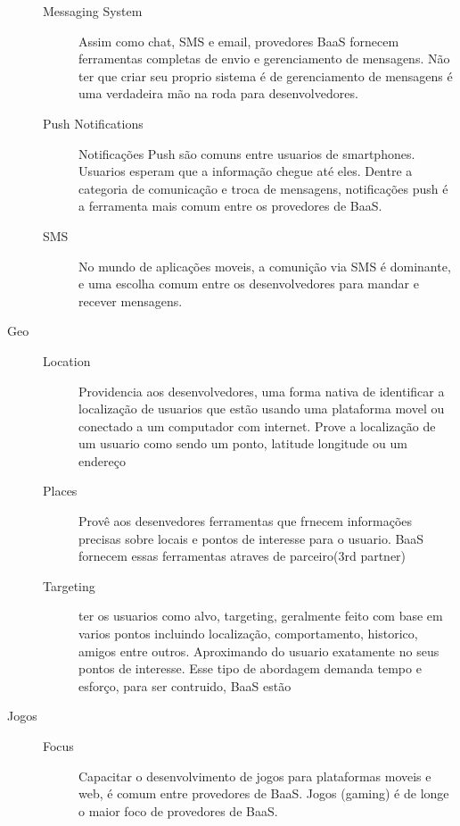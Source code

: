 \begin{description}
\begin{description}
				\item[Messaging System] { Assim como chat, SMS e email, provedores BaaS fornecem ferramentas completas de envio e gerenciamento de mensagens. Não ter que criar seu proprio sistema é de gerenciamento de mensagens é uma verdadeira mão na roda para desenvolvedores.}
				
				\item[Push Notifications] { Notificações Push são comuns entre usuarios de smartphones. Usuarios esperam que a informação chegue até eles. Dentre a categoria de comunicação e troca de mensagens, notificações push é a ferramenta mais comum entre os provedores de BaaS.}

				\item[SMS] { No mundo de aplicações moveis, a comunição via SMS é dominante, e uma escolha comum entre os desenvolvedores para mandar e recever mensagens.}
			\end{description}
		
		\item[Geo]
			\begin{description}
				\item[]
                \item[Location] { Providencia aos desenvolvedores, uma forma nativa de identificar a localização de usuarios que estão usando uma plataforma movel ou conectado a um computador com internet. Prove a localização de um usuario como sendo um ponto, latitude longitude ou um endereço}
				
				\item[Places] { Provê aos desenvedores ferramentas que frnecem informações precisas sobre locais e pontos de interesse para o usuario. BaaS fornecem essas ferramentas atraves de parceiro(3rd partner)}
				
				\item[Targeting] { ter os usuarios como alvo, targeting, geralmente feito com base em varios pontos incluindo localização, comportamento, historico, amigos entre outros. Aproximando do usuario exatamente no seus pontos de interesse. Esse tipo de abordagem demanda tempo e esforço, para ser contruido, BaaS estão }
			\end{description}
		
		\item[Jogos]
			\begin{description}
				\item[]
                \item[Focus] { Capacitar o desenvolvimento de jogos para plataformas moveis e web, é comum entre provedores de BaaS. Jogos (gaming) é de longe o maior foco de provedores de BaaS.}
			\end{description}


\end{description}
